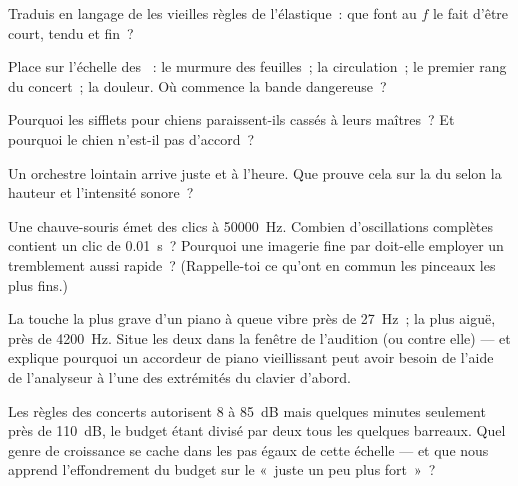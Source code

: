 \begin{exercise}[$\star$]\label{exo:g8:sound-pitch-loudness:5}
Traduis en langage de  les vieilles règles de l'élastique~:
que font au $f$ le fait d'être court, tendu et fin~?
\end{exercise}

\begin{exercise}[$\star$]\label{exo:g8:sound-pitch-loudness:6}
Place sur l'échelle des ~: le murmure des feuilles~; la
circulation~; le premier rang du concert~; la douleur. Où commence la
bande dangereuse~?
\end{exercise}

\begin{exercise}[$\star$]\label{exo:g8:sound-pitch-loudness:7}
Pourquoi les sifflets pour chiens paraissent-ils cassés à leurs
maîtres~? Et pourquoi le chien n'est-il pas d'accord~?
\end{exercise}

\begin{exercise}[$\star$]\label{exo:g8:sound-pitch-loudness:8}
Un orchestre lointain arrive juste et à l'heure. Que prouve cela sur
la  du  selon la hauteur et l'intensité sonore~?
\end{exercise}

\begin{exercise}[$\star\star$]\label{exo:g8:sound-pitch-loudness:9}
Une chauve-souris émet des clics à \qty{50000}{Hz}. Combien
d'oscillations complètes contient un clic de \qty{0.01}{s}~? Pourquoi
une imagerie fine par  doit-elle employer un tremblement aussi
rapide~? (Rappelle-toi ce qu'ont en commun les pinceaux les plus
fins.)
\end{exercise}

\begin{exercise}[$\star\star$]\label{exo:g8:sound-pitch-loudness:10}
La touche la plus grave d'un piano à queue vibre près de
\qty{27}{Hz}~; la plus aiguë, près de \qty{4200}{Hz}. Situe les deux
dans la fenêtre de l'audition (ou contre elle) --- et explique
pourquoi un accordeur de piano vieillissant peut avoir besoin de
l'aide de l'analyseur à l'une des extrémités du clavier d'abord.
\end{exercise}

\begin{exercise}[$\star\star$]\label{exo:g8:sound-pitch-loudness:11}
Les règles des concerts autorisent $8$  à \qty{85}{dB} mais
quelques minutes seulement près de \qty{110}{dB}, le budget étant
divisé par deux tous les quelques barreaux. Quel genre de croissance
se cache dans les pas égaux de cette échelle --- et que nous apprend
l'effondrement du budget sur le «~juste un peu plus fort~»~?
\end{exercise}

